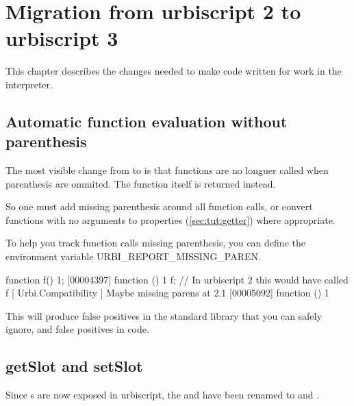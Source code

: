 
\chapter{Migration from urbiscript 2 to urbiscript 3}

This chapter describes the changes needed to make \us code written for
 work in the  interpreter.

\section{Automatic function evaluation without parenthesis}

The most visible change from  to  is that functions are no
longuer called when parenthesis are ommited. The function itself is
returned instead.

So one must add missing parenthesis around all function calls, or convert
functions with no arguments to properties (\ref{sec:tut:getter}) where
appropriate.

To help you track function calls missing parenthesis, you can define
the environment variable URBI\_REPORT\_MISSING\_PAREN.

\begin{urbiunchecked}
function f() {1};
[00004397] function () { 1 }
f; // In urbiscript 2 this would have called f
[  Urbi.Compatibility   ] Maybe missing parens at 2.1
[00005092] function () { 1 }
\end{urbiunchecked}

This will produce false positives in the \us standard library that you can
safely ignore, and false positives in  code.

\section{getSlot and setSlot}

Since s are now exposed in urbiscript, the 
 and  have been renamed to
 and .
